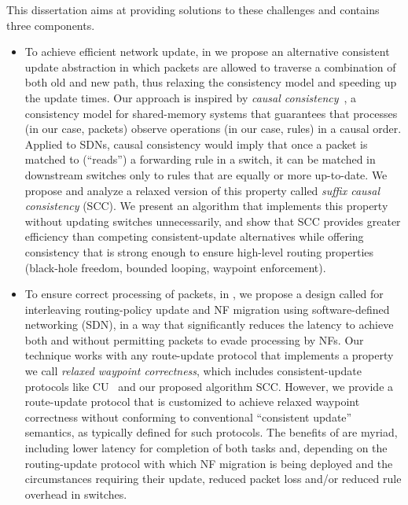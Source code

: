 This dissertation aims at providing solutions to these challenges and contains three components. 
\begin{itemize}
\item To achieve efficient network update, in  we propose an alternative consistent update abstraction in which packets are allowed to traverse a combination of
both old and new path, thus relaxing the consistency model and speeding up the update
times.  Our approach is inspired by \textit{causal consistency}~\cite{causal}, a consistency model for shared-memory systems that guarantees that processes (in our case, packets) observe operations (in our case, rules) in a causal order. Applied to SDNs, causal consistency would imply that once a packet is matched to (``reads'') a forwarding rule
in a switch, it can be matched in downstream switches only to rules
that are equally or more up-to-date. We propose and analyze a relaxed version of this property called
\textit{suffix causal consistency} (SCC). We present an algorithm that implements this property
without updating switches unnecessarily, and show that SCC
provides greater efficiency than competing consistent-update
alternatives while offering consistency that is strong enough to
ensure high-level routing properties (black-hole freedom, bounded
looping, waypoint enforcement).

\item To ensure correct processing of packets, in , we propose a design called \sysname for interleaving routing-policy update and NF migration using software-defined networking (SDN), in a way that
significantly reduces the latency to achieve both and without permitting packets to evade processing by NFs.  Our technique works with any route-update protocol that implements a property we call
\textit{relaxed waypoint correctness}, which includes
consistent-update protocols like CU~\cite{CU} and our proposed algorithm SCC.
However, we provide a route-update protocol that is customized to
achieve relaxed waypoint correctness without conforming to
conventional ``consistent update'' semantics, as typically defined for
such protocols. The benefits of \sysname are myriad, including lower latency for completion of both tasks
and, depending on the routing-update protocol with which NF migration
is being deployed and the circumstances requiring their update,
reduced packet loss and/or reduced rule overhead in switches.


\end{itemize}
